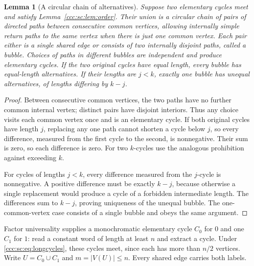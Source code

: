 \documentclass[11pt,letterpaper]{article}
\newtheorem{lemma}[theorem]{Lemma}
\theoremstyle{definition}
\theoremstyle{remark}
\begin{document}
\begin{lemma}[A circular chain of alternatives]\label{ccc:sc:lem:bubbles}
Suppose two elementary cycles meet and satisfy Lemma~\ref{ccc:sc:lem:order}. Their union is a circular chain of pairs of directed paths between consecutive common vertices, allowing internally simple return paths to the same vertex when there is just one common vertex. Each pair either is a single shared edge or consists of two internally disjoint paths, called a \emph{bubble}. Choices of paths in different bubbles are independent and produce elementary cycles. If the two original cycles have equal length, every bubble has equal-length alternatives. If their lengths are $j<k$, exactly one bubble has unequal alternatives, of lengths differing by $k-j$.
\end{lemma}
\begin{proof}
Between consecutive common vertices, the two paths have no further common internal vertex; distinct pairs have disjoint interiors. Thus any choice visits each common vertex once and is an elementary cycle. If both original cycles have length $j$, replacing any one path cannot shorten a cycle below $j$, so every difference, measured from the first cycle to the second, is nonnegative. Their sum is zero, so each difference is zero. For two $k$-cycles use the analogous prohibition against exceeding $k$.

For cycles of lengths $j<k$, every difference measured from the $j$-cycle is nonnegative. A positive difference must be exactly $k-j$, because otherwise a single replacement would produce a cycle of a forbidden intermediate length. The differences sum to $k-j$, proving uniqueness of the unequal bubble. The one-common-vertex case consists of a single bubble and obeys the same argument.
\end{proof}

Factor universality supplies a monochromatic elementary cycle $C_0$ for $0$ and one $C_1$ for $1$: read a constant word of length at least $n$ and extract a cycle. Under \eqref{ccc:sc:eq:longcycles}, these cycles meet, since each has more than $n/2$ vertices. Write $U=C_0\cup C_1$ and $m=|V(U)|\le n$. Every shared edge carries both labels.
\end{document}

